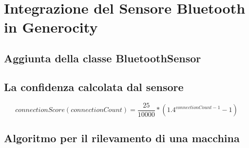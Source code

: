 \chapter{Integrazione del Sensore Bluetooth in Generocity}

\section{Aggiunta della classe BluetoothSensor}

\section{La confidenza calcolata dal sensore}
\[connectionScore(connectionCount) = \frac{25}{10000} * (1.4^{connectionCount-1} - 1)\]
\section{Algoritmo per il rilevamento di una macchina}

